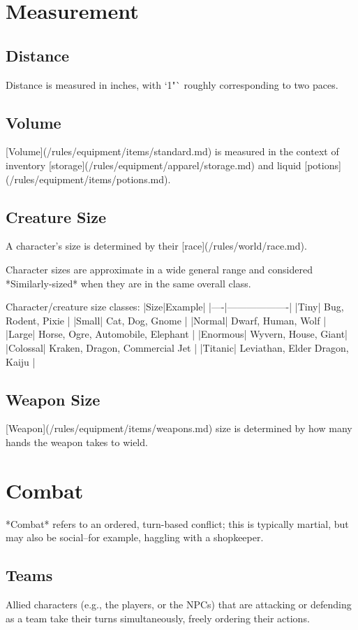 \chapter{Measurement}

\section{Distance}
Distance is measured in inches, with `1"` roughly corresponding to two paces.

\section{Volume}
[Volume](/rules/equipment/items/standard.md) is measured in the context of 
inventory [storage](/rules/equipment/apparel/storage.md)
and liquid [potions](/rules/equipment/items/potions.md).

\section{Creature Size}
A character's size is determined by their [race](/rules/world/race.md).

Character sizes are approximate in a wide general range 
and considered *Similarly-sized* when they are in the same overall class. 

Character/creature size classes:
|Size|Example|
|----|-------------------|
|Tiny| Bug, Rodent, Pixie |
|Small| Cat, Dog, Gnome |
|Normal| Dwarf, Human, Wolf |
|Large| Horse, Ogre, Automobile, Elephant |
|Enormous| Wyvern, House, Giant|
|Colossal| Kraken, Dragon, Commercial Jet |
|Titanic| Leviathan, Elder Dragon, Kaiju |


\section{Weapon Size}
[Weapon](/rules/equipment/items/weapons.md) size is determined by how many hands the weapon takes to wield.



\chapter{Combat}
*Combat* refers to an ordered, turn-based conflict; this is typically martial, 
but may also be social--for example, haggling with a shopkeeper.

\section{Teams}
Allied characters (e.g., the players, or the NPCs) that are attacking or defending as a team
take their turns simultaneously, freely ordering their actions.

